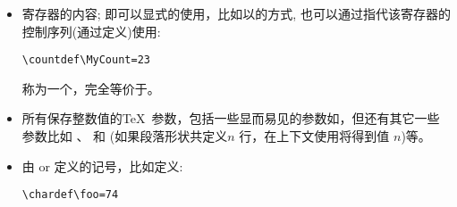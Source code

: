 \documentclass{book}
\begin{document}
\begin{itemize} \item {} 寄存器的内容;
即可以显式的使用，比如以的方式,
也可以通过指代该寄存器的控制序列(通过定义)使用:
\begin{verbatim}
\countdef\MyCount=23
\end{verbatim}
称为一个，完全等价于。

\item 所有保存整数值的\TeX\ 参数，包括一些显而易见的参数如，但还有其它一些参数比如 、 和 (如果段落形状共定义$n$ 行，在上下文使用将得到值 $n$)等。

\item\label{num:chardef} 由 or 定义的记号，比如定义:

\begin{verbatim}
\chardef\foo=74
\end{verbatim}


\end{itemize}
\end{document}

